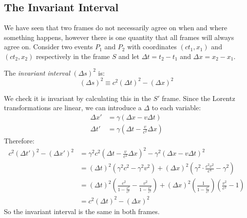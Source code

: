 \documentclass[../main.tex]{subfiles}
\begin{document}
\subsection{The Invariant Interval}
We have seen that two frames do not necessarily agree on when and where something happens, however there is one quantity that all frames will always agree on.
Consider two events $P_1$ and $P_2$ with coordinates $(ct_1, x_1)$ and $(ct_2, x_2)$ respectively in the frame $S$ and let $\Delta t = t_2  - t_1$ and $\Delta x = x_2 - x_1$.
\begin{definition}
  The \textit{invariant interval} $(\Delta s)^2$ is:
  \[
    (\Delta s)^2 \equiv c^2 (\Delta t)^2 - (\Delta x)^2
  \]
\end{definition}
We check it is invariant by calculating this in the $S'$ frame.
Since the Lorentz transformations are linear, we can introduce a $\Delta$ to each variable:
\begin{align*}
  \Delta x' &= \gamma(\Delta x - v \Delta t) \\
  \Delta t' &= \gamma\left(\Delta t - \frac{v}{c^2} \Delta x\right)
\end{align*}
Therefore:
\begin{align*}
  c^2(\Delta t')^2 - (\Delta x')^2 &= \gamma^2 c^2 \left(\Delta t - \frac{v}{c^2} \Delta x\right)^2 - \gamma^2 \left(\Delta x - v \Delta t\right)^2 \\
                                   &= (\Delta t)^2(\gamma^2 c^2 - \gamma^2 v^2) + (\Delta x)^2\left(\gamma^2 \cdot \frac{c^2 v^2}{c^4} - \gamma^2\right) \\
                                   &= (\Delta t)^2\left(\frac{c^2}{1 - \frac{v^2}{c^2}} - \frac{v^2}{1 - \frac{v^2}{c^2}}\right) + (\Delta x)^2\left(\frac{1}{1 - \frac{v^2}{c^2}}\right)\left(\frac{v^2}{c^2} - 1\right)\\
                                   &= c^2(\Delta t)^2 - (\Delta x)^2
\end{align*}
So the invariant interval is the same in both frames.
\end{document}
